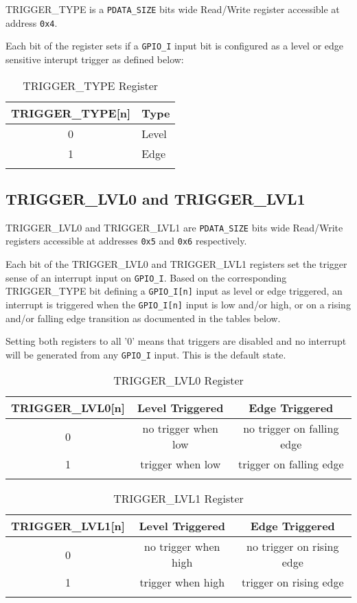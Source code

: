 TRIGGER\_TYPE is a \texttt{PDATA\_SIZE} bits wide Read/Write register accessible at address \texttt{0x4}.

Each bit of the register sets if a \texttt{GPIO\_I} input bit is configured as a level or edge sensitive interupt trigger as defined below:

\begin{longtable}[]{@{}cl@{}}
\toprule
\textbf{TRIGGER\_TYPE[n]} & \textbf{Type}\tabularnewline
\midrule
\endhead
0 & Level\tabularnewline
1 & Edge\tabularnewline
\bottomrule
\caption{TRIGGER\_TYPE Register}
\end{longtable}

\subsection{TRIGGER\_LVL0 and TRIGGER\_LVL1}\label{triggermode}

TRIGGER\_LVL0 and TRIGGER\_LVL1 are \texttt{PDATA\_SIZE} bits wide Read/Write registers accessible at addresses \texttt{0x5} and \texttt{0x6} respectively.

Each bit of the TRIGGER\_LVL0 and TRIGGER\_LVL1 registers set the trigger sense of an interrupt input on \texttt{GPIO\_I}.  Based on the corresponding TRIGGER\_TYPE bit defining a \texttt{GPIO\_I[n]} input as level or edge triggered, an interrupt is triggered when the \texttt{GPIO\_I[n]} input is low and/or high, or on a rising and/or falling edge transition as documented in the tables below.

Setting both registers to all '0' means that triggers are disabled and no interrupt will be generated from any \texttt{GPIO\_I} input. This is the default state.

\begin{longtable}[]{@{}ccc@{}}
\toprule
\textbf{TRIGGER\_LVL0[n]} & \textbf{Level Triggered} & \textbf{Edge Triggered}\tabularnewline
\midrule
\endhead
0 & no trigger when low & no trigger on falling edge\tabularnewline
1 & trigger when low & trigger on falling edge\tabularnewline
\bottomrule
\caption{TRIGGER\_LVL0 Register}
\end{longtable}

\begin{longtable}[]{@{}ccc@{}}
\toprule
\textbf{TRIGGER\_LVL1[n]} & \textbf{Level Triggered} & \textbf{Edge Triggered}\tabularnewline
\midrule
\endhead
0 & no trigger when high & no trigger on rising edge\tabularnewline
1 & trigger when high & trigger on rising edge\tabularnewline
\bottomrule
\caption{TRIGGER\_LVL1 Register}
\end{longtable}

